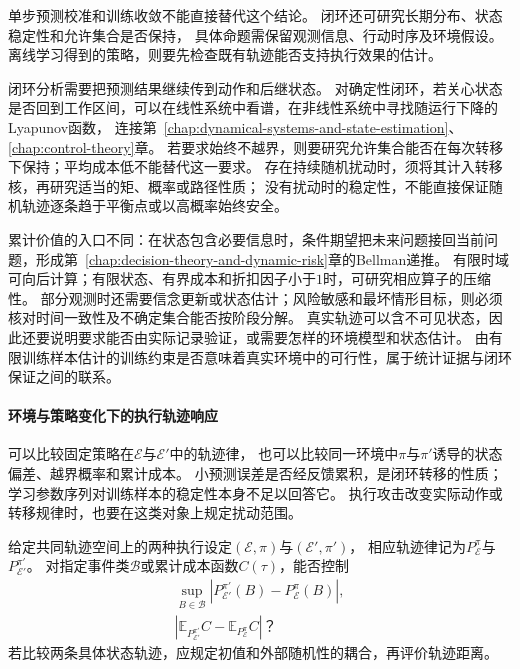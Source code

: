 单步预测校准和训练收敛不能直接替代这个结论。
闭环还可研究长期分布、状态稳定性和允许集合是否保持，
具体命题需保留观测信息、行动时序及环境假设。
离线学习得到的策略，则要先检查既有轨迹能否支持执行效果的估计。

闭环分析需要把预测结果继续传到动作和后继状态。
对确定性闭环，若关心状态是否回到工作区间，可以在线性系统中看谱，在非线性系统中寻找随运行下降的Lyapunov函数，
连接第~\ref{chap:dynamical-systems-and-state-estimation}、\ref{chap:control-theory}章。
若要求始终不越界，则要研究允许集合能否在每次转移下保持；平均成本低不能替代这一要求。
存在持续随机扰动时，须将其计入转移核，再研究适当的矩、概率或路径性质；
没有扰动时的稳定性，不能直接保证随机轨迹逐条趋于平衡点或以高概率始终安全。

累计价值的入口不同：在状态包含必要信息时，条件期望把未来问题接回当前问题，形成第~\ref{chap:decision-theory-and-dynamic-risk}章的Bellman递推。
有限时域可向后计算；有限状态、有界成本和折扣因子小于$1$时，可研究相应算子的压缩性。
部分观测时还需要信念更新或状态估计；风险敏感和最坏情形目标，则必须核对时间一致性及不确定集合能否按阶段分解。
真实轨迹可以含不可见状态，因此还要说明要求能否由实际记录验证，或需要怎样的环境模型和状态估计。
由有限训练样本估计的训练约束是否意味着真实环境中的可行性，属于统计证据与闭环保证之间的联系。

\paragraph{环境与策略变化下的执行轨迹响应}
\label{sec:future-analysis-trajectory-perturbation}

可以比较固定策略在$\mathcal E$与$\mathcal E'$中的轨迹律，
也可以比较同一环境中$\pi$与$\pi'$诱导的状态偏差、越界概率和累计成本。
小预测误差是否经反馈累积，是闭环转移的性质；
学习参数序列对训练样本的稳定性本身不足以回答它。
执行攻击改变实际动作或转移规律时，也要在这类对象上规定扰动范围。

\begin{mathproblem}[闭环过程对环境与策略变化的响应]
  \label{question:future-trajectory-perturbation}
  给定共同轨迹空间上的两种执行设定$(\mathcal E,\pi)$与$(\mathcal E',\pi')$，
  相应轨迹律记为$P_{\mathcal E}^{\pi}$与$P_{\mathcal E'}^{\pi'}$。
  对指定事件类$\mathcal B$或累计成本函数$C(\tau)$，能否控制
  \[
    \begin{gathered}
      \sup_{B\in\mathcal B}
        |P_{\mathcal E'}^{\pi'}(B)-P_{\mathcal E}^{\pi}(B)|,\\
      |\mathbb E_{P_{\mathcal E'}^{\pi'}}C
       -\mathbb E_{P_{\mathcal E}^{\pi}}C|\text{？}
    \end{gathered}
  \]
  若比较两条具体状态轨迹，应规定初值和外部随机性的耦合，再评价轨迹距离。
\end{mathproblem}

